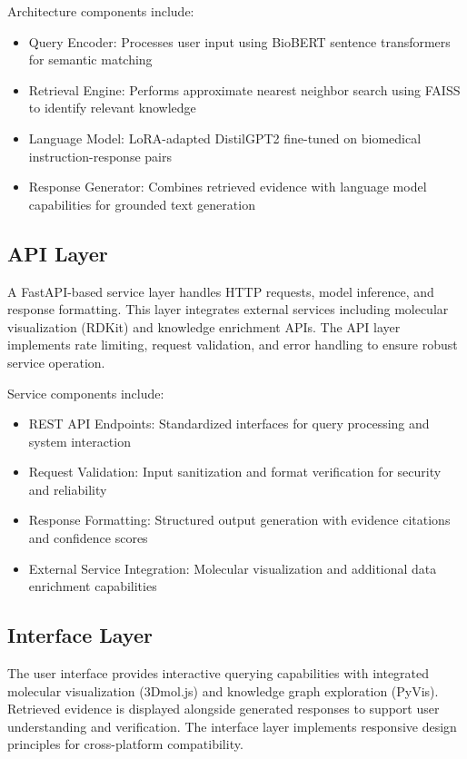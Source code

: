 \documentclass[conference]{IEEEtran}
\begin{document}
Architecture components include:
\begin{itemize}
\item Query Encoder: Processes user input using BioBERT sentence transformers for semantic matching
\item Retrieval Engine: Performs approximate nearest neighbor search using FAISS to identify relevant knowledge
\item Language Model: LoRA-adapted DistilGPT2 fine-tuned on biomedical instruction-response pairs
\item Response Generator: Combines retrieved evidence with language model capabilities for grounded text generation
\end{itemize}

\subsection{API Layer}
A FastAPI-based service layer handles HTTP requests, model inference, and response formatting. This layer integrates external services including molecular visualization (RDKit) and knowledge enrichment APIs. The API layer implements rate limiting, request validation, and error handling to ensure robust service operation.

Service components include:
\begin{itemize}
\item REST API Endpoints: Standardized interfaces for query processing and system interaction
\item Request Validation: Input sanitization and format verification for security and reliability
\item Response Formatting: Structured output generation with evidence citations and confidence scores
\item External Service Integration: Molecular visualization and additional data enrichment capabilities
\end{itemize}

\subsection{Interface Layer}
The user interface provides interactive querying capabilities with integrated molecular visualization (3Dmol.js) and knowledge graph exploration (PyVis). Retrieved evidence is displayed alongside generated responses to support user understanding and verification. The interface layer implements responsive design principles for cross-platform compatibility.
\end{document}
